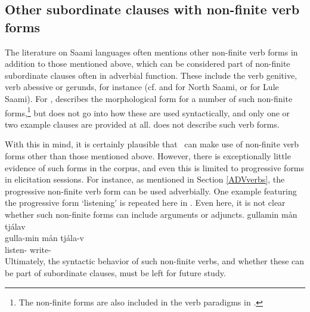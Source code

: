 \subsection{Other subordinate clauses with non-finite verb forms}\label{otherSubclauses}
The literature on Saami languages often mentions other non-finite verb forms in addition to those mentioned above, which can be considered part of non-finite subordinate clauses often in adverbial function. These include the verb genitive, verb abessive or gerunds, for instance (cf. \citet[103-104]{Sammallahti1998} and \citet[67-73]{Svonni2009} for North Saami, or \citet[104-111]{Spiik1989} for Lule Saami). 
For \PS, \citet[95-106]{Lehtiranta1992} describes the morphological form for a number of such non-finite forms,\footnote{The non-finite forms are also included in the verb paradigms in \citet[150-155]{Lehtiranta1992}.} 
but does not go into how these are used syntactically, and only one or two example clauses are provided at all. \citet{Lagercrantz1926} does not describe such verb forms. 

With this in mind, it is certainly plausible that \PS\ can make use of non-finite verb forms other than those mentioned above. However, there is exceptionally little evidence of such forms in the corpus, and even this is limited to progressive forms in elicitation sessions. For instance, as mentioned in Section \ref{ADVverbs}, the progressive non-finite verb form can be used adverbially. One example featuring the progressive form  ‘listening’ is repeated here in . Even here, it is not clear whether such non-finite forms can include arguments or adjuncts. 
\ea\label{ADVverbsEx2repeat}%
\glll	gullamin mån tjálav\\
	gulla-min mån tjála-v\\
	listen-  write-\\\nopagebreak
{}	
\z
Ultimately, the syntactic behavior of such non-finite verbs, and whether these can be part of subordinate clauses, must be left for future study.  



